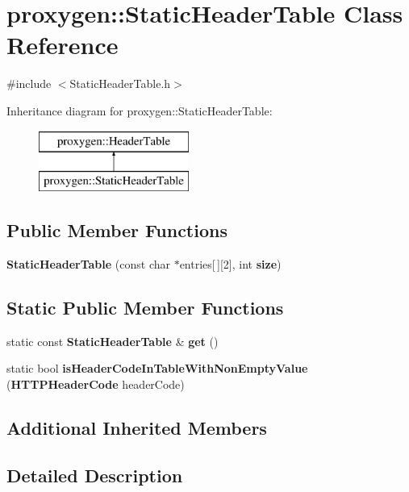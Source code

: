 \section{proxygen\+:\+:Static\+Header\+Table Class Reference}
\label{classproxygen_1_1StaticHeaderTable}


{\ttfamily \#include $<$Static\+Header\+Table.\+h$>$}

Inheritance diagram for proxygen\+:\+:Static\+Header\+Table\+:\begin{figure}[H]
\begin{center}
\leavevmode
\includegraphics[height=2.000000cm]{classproxygen_1_1StaticHeaderTable}
\end{center}
\end{figure}
\subsection*{Public Member Functions}
\begin{DoxyCompactItemize}
\item 
{\bf Static\+Header\+Table} (const char $\ast$entries[$\,$][2], int {\bf size})
\end{DoxyCompactItemize}
\subsection*{Static Public Member Functions}
\begin{DoxyCompactItemize}
\item 
static const {\bf Static\+Header\+Table} \& {\bf get} ()
\item 
static bool {\bf is\+Header\+Code\+In\+Table\+With\+Non\+Empty\+Value} ({\bf H\+T\+T\+P\+Header\+Code} header\+Code)
\end{DoxyCompactItemize}
\subsection*{Additional Inherited Members}


\subsection{Detailed Description}


